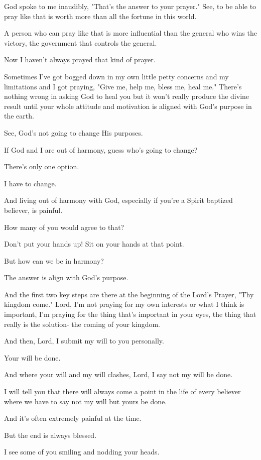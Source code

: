 \documentclass[11pt]{article}
\begin{document}
God spoke to me inaudibly, "That's the answer
to your prayer." See, to be able to pray like
that is worth more than all the fortune in
this world.

A person who can pray like that is more
influential than the general who wins the
victory, the government that controls the
general.

Now I haven't always prayed that kind of
prayer.

Sometimes I've got bogged down in my own
little petty concerns and my limitations and I
got praying, "Give me, help me, bless me, heal
me." There's nothing wrong in asking God to
heal you but it won't really produce the
divine result until your whole attitude and
motivation is aligned with God's purpose in
the earth.

See, God's not going to change His purposes.

If God and I are out of harmony, guess who's
going to change?

There's only one option.

I have to change.

And living out of harmony with God, especially
if you're a Spirit baptized believer, is
painful.

How many of you would agree to that?

Don't put your hands up! Sit on your hands at
that point.

But how can we be in harmony?

The answer is align with God's purpose.

And the first two key steps are there at the
beginning of the Lord's Prayer, "Thy kingdom
come." Lord, I'm not praying for my own
interests or what I think is important, I'm
praying for the thing that's important in your
eyes, the thing that really is the solution-
the coming of your kingdom.

And then, Lord, I submit my will to you
personally.

Your will be done.

And where your will and my will clashes, Lord,
I say not my will be done.

I will tell you that there will always come a
point in the life of every believer where we
have to say not my will but yours be done.

And it's often extremely painful at the time.

But the end is always blessed.

I see some of you smiling and nodding your
heads.
\end{document}
